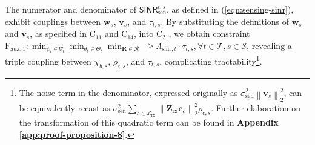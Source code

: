 \documentclass[10pt,journal,compsoc]{IEEEtran}
\theoremstyle{myremark}
\theoremstyle{myexample}
\begin{document}
\begin{appendices}
The numerator and denominator of $ \mathsf{SINR}_\mathrm{sen}^{t,s} $, as defined in (\ref{eqn:sensing-sinr}), exhibit couplings between $ \mathbf{w}_s $, $ \mathbf{v}_s $,  and $ \tau_{t,s} $. By substituting the definitions of $ \mathbf{w}_s $ and $ \mathbf{v}_s $, as specified in $ \mathrm{C}_{11} $ and $ \mathrm{C}_{14} $, into $ \mathrm{C}_{21} $, we obtain constraint $ \mathrm{F}_{\mathrm{aux},1}:  \min_{\psi_t \in \Psi_t} \min_{\theta_t \in \Theta_t} \min_{\mathbf{R} \in \mathcal{R}} $  $  \geq \Lambda_{\mathrm{sinr},t} \cdot \tau_{t,s}, \forall t \in \mathcal{T}, s \in \mathcal{S} $, revealing a triple coupling between $ \chi_{b,s} $, $ \rho_{c,s} $, and $ \tau_{t,s} $, complicating tractability\footnote{The noise term in the denominator, expressed originally as $ \sigma_\mathrm{sen}^2 \left\| \mathbf{v}_s \right\|_2^2  $, can be equivalently recast as $ \sigma_\mathrm{sen}^2 \sum_{c \in \mathcal{L}_\mathrm{rx}} \left\| \mathbf{Z}_\mathrm{rx} \mathbf{c}_c \right\|_2^2 \rho_{c,s} $. Further elaboration on the transformation of this quadratic term can be found in \textbf{Appendix \ref{app:proof-proposition-8}}.}.



\end{appendices}
\end{document}
